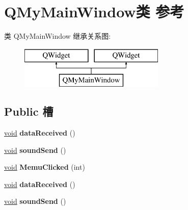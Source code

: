 \hypertarget{class_q_my_main_window}{}\section{Q\+My\+Main\+Window类 参考}
\label{class_q_my_main_window}
类 Q\+My\+Main\+Window 继承关系图\+:\begin{figure}[H]
\begin{center}
\leavevmode
\includegraphics[height=2.000000cm]{class_q_my_main_window}
\end{center}
\end{figure}
\subsection*{Public 槽}
\begin{DoxyCompactItemize}
\item 
\mbox{\label{class_q_my_main_window_abd80f47c3f7a2452fb36c9ccbe0c47d0}} 
\hyperlink{interfacevoid}{void} {\bfseries data\+Received} ()
\item 
\mbox{\label{class_q_my_main_window_a946a2ae4ca11c6c4e8de6d4a56c5772a}} 
\hyperlink{interfacevoid}{void} {\bfseries sound\+Send} ()
\item 
\mbox{\label{class_q_my_main_window_ad74fccb2d8c785cb99b3d812ed95e895}} 
\hyperlink{interfacevoid}{void} {\bfseries Memu\+Clicked} (int)
\item 
\mbox{\label{class_q_my_main_window_abd80f47c3f7a2452fb36c9ccbe0c47d0}} 
\hyperlink{interfacevoid}{void} {\bfseries data\+Received} ()
\item 
\mbox{\label{class_q_my_main_window_a946a2ae4ca11c6c4e8de6d4a56c5772a}} 
\hyperlink{interfacevoid}{void} {\bfseries sound\+Send} ()
\end{DoxyCompactItemize}
